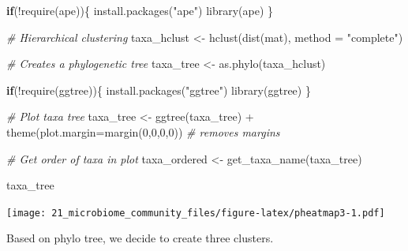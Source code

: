 \documentclass[
]{book}
\newenvironment{Shaded}{\begin{snugshade}}{\end{snugshade}}
\newcommand{\AttributeTok}[1]{\textcolor[rgb]{0.77,0.63,0.00}{#1}}
\newcommand{\CommentTok}[1]{\textcolor[rgb]{0.56,0.35,0.01}{\textit{#1}}}
\newcommand{\ControlFlowTok}[1]{\textcolor[rgb]{0.13,0.29,0.53}{\textbf{#1}}}
\newcommand{\DecValTok}[1]{\textcolor[rgb]{0.00,0.00,0.81}{#1}}
\newcommand{\FunctionTok}[1]{\textcolor[rgb]{0.00,0.00,0.00}{#1}}
\newcommand{\NormalTok}[1]{#1}
\newcommand{\OtherTok}[1]{\textcolor[rgb]{0.56,0.35,0.01}{#1}}
\newcommand{\SpecialCharTok}[1]{\textcolor[rgb]{0.00,0.00,0.00}{#1}}
\newcommand{\StringTok}[1]{\textcolor[rgb]{0.31,0.60,0.02}{#1}}
\begin{document}
\begin{Shaded}
\begin{Highlighting}[]
\ControlFlowTok{if}\NormalTok{(}\SpecialCharTok{!}\FunctionTok{require}\NormalTok{(ape))\{}
    \FunctionTok{install.packages}\NormalTok{(}\StringTok{"ape"}\NormalTok{)}
    \FunctionTok{library}\NormalTok{(ape)}
\NormalTok{\}}

\CommentTok{\# Hierarchical clustering}
\NormalTok{taxa\_hclust }\OtherTok{\textless{}{-}} \FunctionTok{hclust}\NormalTok{(}\FunctionTok{dist}\NormalTok{(mat), }\AttributeTok{method =} \StringTok{"complete"}\NormalTok{)}

\CommentTok{\# Creates a phylogenetic tree}
\NormalTok{taxa\_tree }\OtherTok{\textless{}{-}} \FunctionTok{as.phylo}\NormalTok{(taxa\_hclust)}
\end{Highlighting}
\end{Shaded}

\begin{Shaded}
\begin{Highlighting}[]
\ControlFlowTok{if}\NormalTok{(}\SpecialCharTok{!}\FunctionTok{require}\NormalTok{(ggtree))\{}
    \FunctionTok{install.packages}\NormalTok{(}\StringTok{"ggtree"}\NormalTok{)}
    \FunctionTok{library}\NormalTok{(ggtree)}
\NormalTok{\}}

\CommentTok{\# Plot taxa tree}
\NormalTok{taxa\_tree }\OtherTok{\textless{}{-}} \FunctionTok{ggtree}\NormalTok{(taxa\_tree) }\SpecialCharTok{+} 
  \FunctionTok{theme}\NormalTok{(}\AttributeTok{plot.margin=}\FunctionTok{margin}\NormalTok{(}\DecValTok{0}\NormalTok{,}\DecValTok{0}\NormalTok{,}\DecValTok{0}\NormalTok{,}\DecValTok{0}\NormalTok{)) }\CommentTok{\# removes margins}

\CommentTok{\# Get order of taxa in plot}
\NormalTok{taxa\_ordered }\OtherTok{\textless{}{-}} \FunctionTok{get\_taxa\_name}\NormalTok{(taxa\_tree)}

\NormalTok{taxa\_tree}
\end{Highlighting}
\end{Shaded}

\texttt{[image: 21\_microbiome\_community\_files/figure-latex/pheatmap3-1.pdf]}

Based on phylo tree, we decide to create three clusters.
\end{document}
